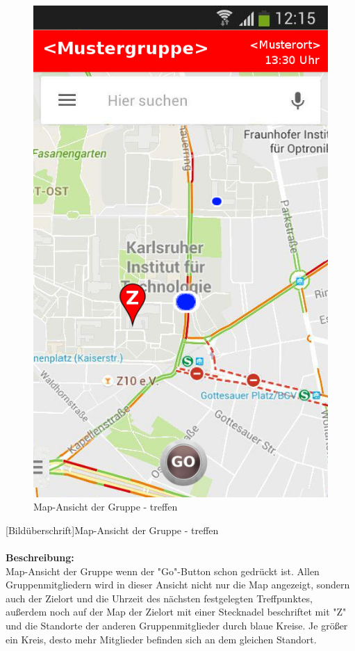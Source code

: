 \begin{figure}
	\caption{Map-Ansicht der Gruppe - treffen}
	\includegraphics[scale =0.5]{resources/images/map_Go.png}
\end{figure}
[Bildüberschrift]Map-Ansicht der Gruppe - treffen\\ \\
\textbf{Beschreibung:}\\
Map-Ansicht der Gruppe wenn der "Go"-Button schon gedrückt ist. Allen Gruppenmitgliedern wird in dieser Ansicht nicht nur die Map angezeigt, sondern auch der Zielort und die Uhrzeit des nächsten festgelegten Treffpunktes, außerdem noch auf der Map der Zielort mit einer Stecknadel beschriftet mit "Z" und die Standorte der anderen Gruppenmitglieder durch blaue Kreise. Je größer ein Kreis, desto mehr Mitglieder befinden sich an dem gleichen Standort.\\
